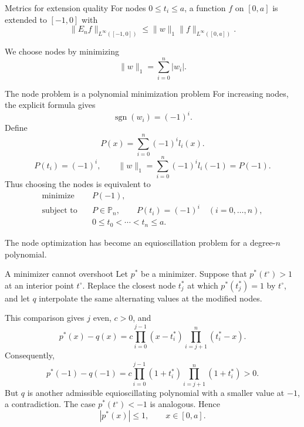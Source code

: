 \documentclass[aspectratio=169,11pt]{beamer}
\begin{document}
\begin{frame}{Metrics for extension quality}
\small
For nodes $0\le t_i\le a$, a function $f$ on $[0,a]$ is extended to
$[-1,0]$ with
\[
  \|E_n f\|_{L^\infty([-1,0])}
  \le
  \|w\|_1\|f\|_{L^\infty([0,a])}.
\]

\vspace{2mm}
We choose nodes by minimizing
\[
  \|w\|_1=\sum_{i=0}^n|w_i|.
\]
\end{frame}

\begin{frame}{The node problem is a polynomial minimization problem}
\small
For increasing nodes, the explicit formula gives
\[
  \operatorname{sgn}(w_i)=(-1)^i.
\]
Define
\[
  P(x)=\sum_{i=0}^n(-1)^i l_i(x).
\]
\[
  P(t_i)=(-1)^i,
  \qquad
  \|w\|_1
  =
  \sum_{i=0}^n(-1)^i l_i(-1)
  =
  P(-1).
\]
Thus choosing the nodes is equivalent to
\[
  \boxed{
    \begin{aligned}
      \text{minimize}\quad & P(-1),\\
      \text{subject to}\quad & P\in\mathbb{P}_n,\qquad P(t_i)=(-1)^i\quad(i=0,\ldots,n),\\
      & 0\le t_0<\cdots<t_n\le a.
    \end{aligned}
  }
\]

\vspace{1mm}
The node optimization has become an equioscillation problem for a degree-$n$ polynomial.
\end{frame}

\begin{frame}{A minimizer cannot overshoot}
\small
Let $p^\ast$ be a minimizer. Suppose that
$p^\ast(t^\circ)>1$ at an interior point $t^\circ$. Replace the closest node
$t_j^\ast$ at which $p^\ast(t_j^\ast)=1$ by $t^\circ$, and let $q$ interpolate
the same alternating values at the modified nodes.

\vspace{1mm}
This comparison gives $j$ even, $c>0$, and
\[
  p^\ast(x)-q(x)
  =
  c\prod_{i=0}^{j-1}(x-t_i^\ast)
   \prod_{i=j+1}^{n}(t_i^\ast-x).
\]
Consequently,
\[
  p^\ast(-1)-q(-1)
  =
  c\prod_{i=0}^{j-1}(1+t_i^\ast)
   \prod_{i=j+1}^{n}(1+t_i^\ast)>0.
\]
But $q$ is another admissible equioscillating polynomial with a smaller value at $-1$,
a contradiction. The case $p^\ast(t^\circ)<-1$ is analogous. Hence
\[
  \boxed{|p^\ast(x)|\le 1,\qquad x\in[0,a].}
\]
\end{frame}
\end{document}
